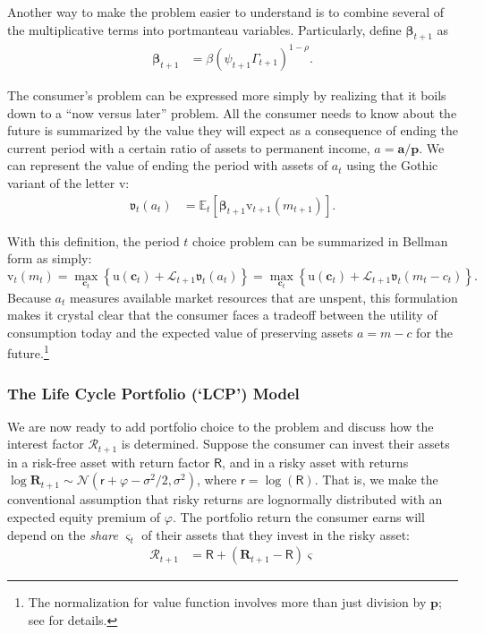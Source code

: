 \documentclass{article}
\newcommand{\CRRA}{\rho}
\newcommand{\uFunc}{\mathrm{u}}
\newcommand{\cLvl}{\mathbf{c}}
\newcommand{\aLvl}{\mathbf{a}}
\newcommand{\Rport}{\mathcal{R}}
\newcommand{\pLvl}{\mathbf{p}}
\newcommand{\DiscFac}{\beta}
\newcommand{\vFunc}{\mathrm{v}}
\newcommand{\Alive}{\mathcal{L}}
\newcommand{\Ex}{\mathbb{E}}
\newcommand{\permGroFac}{\Gamma}
\newcommand{\permShk}{\psi}
\newcommand{\cNrm}{c}
\newcommand{\RNrm}{\mathcal{R}}
\newcommand{\aNrm}{a}
\newcommand{\mNrm}{m}
\newcommand{\Rfree}{\mathsf{R}}
\newcommand{\rfree}{\mathsf{r}}
\newcommand{\eprem}{\varphi}
\newcommand{\Risky}{\mathbf{R}}
\begin{document}
Another way to make the problem easier to understand is to combine several of the multiplicative terms into portmanteau variables.
Particularly, define $\pmb{\DiscFac}_{t+1}$ as
\begin{align}
     \pmb{\DiscFac}_{t+1} & ={\beta} (\permShk_{t+1} \permGroFac_{t+1})^{1-\CRRA}.
\end{align}


The consumer's problem can be expressed more simply by realizing that it boils down to a ``now versus later'' problem.
All the consumer needs to know about the future is summarized by the value they will expect as a consequence of ending the current period with a certain ratio of assets to permanent income, $\aNrm = \aLvl/\pLvl$.
We can represent the value of ending the period with assets of $\aNrm_t$ using the Gothic variant of the letter $\vFunc$:
\begin{align}
    \mathfrak{v}_{t}(\aNrm_{t}) & = \Ex_{t}[\pmb{\DiscFac}_{t+1}\vFunc_{t+1}(\mNrm_{t+1})].
\end{align}

With this definition, the period $t$ choice problem can be summarized in Bellman form as simply:
\begin{equation}
\vFunc_t(\mNrm_t) = \max_{\cLvl_t} \left\{ \uFunc(\cLvl_{t}) + \Alive_{t+1} \mathfrak{v}_{t}(\aNrm_{t}) \right\} = \max_{\cLvl_t} \left\{ \uFunc(\cLvl_{t}) + \Alive_{t+1} \mathfrak{v}_{t}(\mNrm_{t} - \cNrm_t) \right\}.
\end{equation}
Because $\aNrm_t$ measures available market resources that are unspent, this formulation makes it crystal clear that the consumer faces a tradeoff between the utility of consumption today and the expected value of preserving assets $\aNrm=\mNrm -\cNrm$ for the future.\footnote{The normalization for value function involves more than just division by $\pLvl$; see \cite{BufferStockTheory} for details.}

\subsubsection{The Life Cycle Portfolio (`LCP') Model}\label{lcp-model}

We are now ready to add portfolio choice to the problem and discuss how the interest factor $\Rport_{t+1}$ is determined.
Suppose the consumer can invest their assets in a risk-free asset with return factor $\Rfree$, and in a risky asset with returns $\log \Risky_{t+1} \sim \mathcal{N}(\rfree + \eprem - \sigma^{2}/2, \sigma^{2})$, where $\rfree = \log(\Rfree)$.
That is, we make the conventional assumption that risky returns are lognormally distributed with an expected equity premium of $\eprem$.
The portfolio return the consumer earns will depend on the \textit{share} $\varsigma_t$ of their assets that they invest in the risky asset:
\begin{align}
    \Rport_{t+1} & = \Rfree + (\Risky_{t+1}-\Rfree)\varsigma
\end{align}
\end{document}
